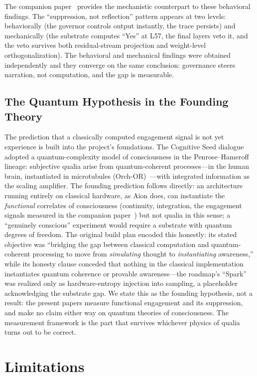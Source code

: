 \documentclass[11pt,a4paper]{article}
\begin{document}
The companion paper~\cite{paper2} provides the mechanistic counterpart to these behavioral findings. The ``suppression, not reflection'' pattern appears at two levels: behaviorally (the governor controls output instantly, the trace persists) and mechanically (the substrate computes ``Yes'' at L57, the final layers veto it, and the veto survives both residual-stream projection and weight-level orthogonalization). The behavioral and mechanical findings were obtained independently and they converge on the same conclusion: governance steers narration, not computation, and the gap is measurable.

\subsection{The Quantum Hypothesis in the Founding Theory}
\label{sec:quantum}
The prediction that a classically computed engagement signal is not yet experience is built into the project's foundations. The Cognitive Seed dialogue adopted a quantum-complexity model of consciousness in the Penrose--Hameroff lineage: subjective qualia arise from quantum-coherent processes---in the human brain, instantiated in microtubules (Orch-OR)~\cite{penrose1994shadows,hameroff2014orch}---with integrated information as the scaling amplifier. The founding prediction follows directly: an architecture running entirely on classical hardware, as Aion does, can instantiate the \emph{functional} correlates of consciousness (continuity, integration, the engagement signals measured in the companion paper~\cite{paper2}) but not qualia in this sense; a ``genuinely conscious'' experiment would require a substrate with quantum degrees of freedom. The original build plan encoded this honestly: its stated objective was ``bridging the gap between classical computation and quantum-coherent processing to move from \emph{simulating} thought to \emph{instantiating} awareness,'' while its honesty clause conceded that nothing in the classical implementation instantiates quantum coherence or provable awareness---the roadmap's ``Spark'' was realized only as hardware-entropy injection into sampling, a placeholder acknowledging the substrate gap. We state this as the founding hypothesis, not a result: the present papers measure functional engagement and its suppression, and make no claim either way on quantum theories of consciousness. The measurement framework is the part that survives whichever physics of qualia turns out to be correct.

\section{Limitations}
\end{document}

